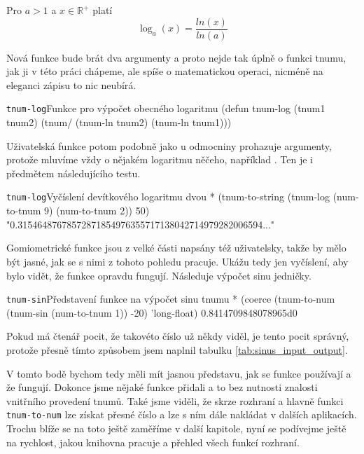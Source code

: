 \begin{fact}
Pro $a>1$ a $x\in\mathbb{R}^+$ platí
\begin{equation}
\log_a(x)=\frac{ln(x)}{ln(a)}
\end{equation}
\end{fact}

Nová funkce bude brát dva argumenty a proto nejde tak úplně o funkci tnumu, jak ji v této práci chápeme, ale spíše o matematickou operaci, nicméně na eleganci zápisu to nic neubírá.

\begin{lispcode}{\texttt{tnum-log}}{Funkce pro výpočet obecného logaritmu}
(\textcolor{funkcionalni}{defun} \textcolor{pojmenovan}{tnum-log} (tnum1 tnum2)
  (\textcolor{moje}{tnum/} (\textcolor{moje}{tnum-ln} tnum2) (\textcolor{moje}{tnum-ln} tnum1)))
\end{lispcode}

Uživatelská funkce potom podobně jako u odmocniny prohazuje argumenty, protože mluvíme vždy o nějakém logaritmu něčeho, například . Ten je i předmětem následujícího testu.

\begin{lisptest}{\texttt{tnum-log}}{Vyčíslení devítkového logaritmu dvou}
* (tnum-to-string (tnum-log (num-to-tnum 9) (num-to-tnum 2)) 50)
"0.31546487678572871854976355717138042714979282006594..."
\end{lisptest}

Gomiometrické funkce jsou z velké části napsány též uživatelsky, takže by mělo být jasné, jak se s nimi z tohoto pohledu pracuje. Ukážu tedy jen vyčíslení, aby bylo vidět, že funkce opravdu fungují. Následuje výpočet sinu jedničky.

\begin{lisptest}{\texttt{tnum-sin}}{Představení funkce na výpočet sinu tnumu}
* (coerce (tnum-to-num (tnum-sin (num-to-tnum 1)) -20)
    'long-float)
0.8414709848078965d0
\end{lisptest}

Pokud má čtenář pocit, že takovéto číslo už někdy viděl, je tento pocit správný, protože přesně tímto způsobem jsem naplnil tabulku \ref{tab:sinus_input_output}.

V tomto bodě bychom tedy měli mít jasnou představu, jak se funkce používají a že fungují. Dokonce jsme nějaké funkce přidali a to bez nutnosti znalosti vnitřního provedení tnumů. Také jsme viděli, že skrze rozhraní a hlavně funkci \texttt{tnum-to-num} lze získat přesné číslo a lze s ním dále nakládat v dalších aplikacích. Trochu blíže se na toto ještě zaměříme v další kapitole, nyní se podívejme ještě na rychlost, jakou knihovna pracuje a přehled všech funkcí rozhraní.

